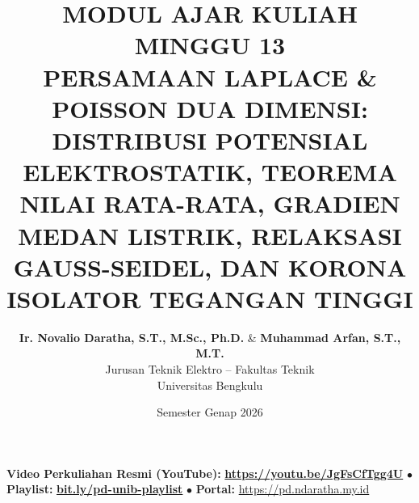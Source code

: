 \documentclass[11pt,a4paper]{article}
\title{\textbf{\Large MODUL AJAR KULIAH MINGGU 13}\\[0.3cm]
\textbf{\LARGE PERSAMAAN LAPLACE \& POISSON DUA DIMENSI: DISTRIBUSI POTENSIAL ELEKTROSTATIK, TEOREMA NILAI RATA-RATA, GRADIEN MEDAN LISTRIK, RELAKSASI GAUSS-SEIDEL, DAN KORONA ISOLATOR TEGANGAN TINGGI}}
\author{\textbf{Ir. Novalio Daratha, S.T., M.Sc., Ph.D.} \& \textbf{Muhammad Arfan, S.T., M.T.} \\ 
Jurusan Teknik Elektro -- Fakultas Teknik \\ 
Universitas Bengkulu}
\date{Semester Genap 2026}
\theoremstyle{definition}
\begin{document}
\maketitle
\begin{center}
  \vspace{-0.25cm}
  \begin{tcolorbox}[colback=red!4!white,colframe=red!75!black,boxrule=0.5pt,arc=2pt,left=6pt,right=6pt,top=3pt,bottom=3pt,width=0.98\textwidth]
    \centering\footnotesize
    \textbf{Video Perkuliahan Resmi (YouTube):} {\color{red!80!black}\textbf{\url{https://youtu.be/JgFsCfTgg4U}}} \quad $\bullet$ \quad \textbf{Playlist:} \href{https://www.youtube.com/playlist?list=PLS5oOZWXZeTw}{\color{blue!80!black}\textbf{bit.ly/pd-unib-playlist}} \quad $\bullet$ \quad \textbf{Portal:} \url{https://pd.ndaratha.my.id}
  \end{tcolorbox}
  \vspace{-0.15cm}
\end{center}
\end{document}
